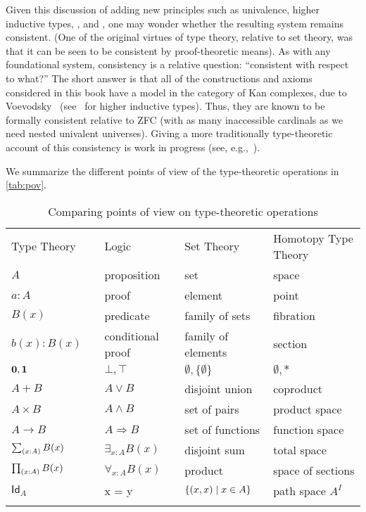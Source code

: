 Given this discussion of adding new principles such as univalence, higher inductive types, \choice{}, and \LEM{}, one may wonder whether the resulting system remains consistent.
(One of the original virtues of type theory, relative to set theory, was that it can be seen to be consistent by proof-theoretic means).
As with any foundational system, consistency is a relative question: ``consistent with respect to what?''
The short answer is that all of the constructions and axioms considered in this book have a model in the category of Kan complexes, due to Voevodsky~\cite{klv:ssetmodel} (see~\cite{ls:hits} for higher inductive types).
Thus, they are known to be formally consistent relative to ZFC (with as many inaccessible cardinals as we need nested univalent universes).
Giving a more traditionally type-theoretic account of this consistency is work in progress (see,
e.g.,~\cite{lh:canonicity,coquand2012constructive}).

We summarize the different points of view of the type-theoretic operations in \autoref{tab:pov}.

\begin{table}[htb]
  \centering
 \begin{tabular}{lllll}
    \toprule
       Type Theory && Logic & Set Theory & Homotopy Type Theory\\ \addlinespace[2pt]
    \midrule
       $A$ && proposition & set & space\\ \addlinespace[2pt]
       $a:A$ && proof & element & point \\ \addlinespace[2pt]
       $B(x)$ && predicate & family of sets & fibration \\ \addlinespace[2pt]
       $b(x) : B(x)$ && conditional proof & family of elements & section\\ \addlinespace[2pt]
       $\mathbf{0}, \mathbf{1}$ && $\bot, \top$ & $\emptyset, \{ \emptyset \}$ & $\emptyset, *$\\ \addlinespace[2pt]
       $A + B$ && $A\vee B$ & disjoint union & coproduct\\ \addlinespace[2pt]
       $A\times B$ && $A\wedge B$ & set of pairs & product space\\ \addlinespace[2pt]
       $A\to B$ && $A\Rightarrow B$ & set of functions & function space\\ \addlinespace[2pt]
       $\sm{x:A}B(x)$ &&  $\exists_{x:A}B(x)$ & disjoint sum & total space\\ \addlinespace[2pt]
       $\prd{x:A}B(x)$ &&  $\forall_{x:A}B(x)$ & product & space of sections\\ \addlinespace[2pt]
       $\mathsf{Id}_{A}$ && x = y & $\{{\mathopen{}(x,x)\mathclose{}} \mid x\in A\}$ & path space $A^I$ \\ \addlinespace[2pt]
    \bottomrule
  \end{tabular}
  \caption{Comparing points of view on type-theoretic operations}\label{tab:pov}
\end{table}


